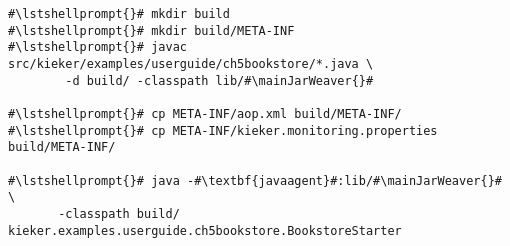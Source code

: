 \begin{lstlisting}[caption=Commands to compile and run the Bookstore under \UnixLikeSystems, label=lst:traceAnalysisCompileRunExample1]
#\lstshellprompt{}# mkdir build
#\lstshellprompt{}# mkdir build/META-INF
#\lstshellprompt{}# javac src/kieker/examples/userguide/ch5bookstore/*.java \
        -d build/ -classpath lib/#\mainJarWeaver{}#

#\lstshellprompt{}# cp META-INF/aop.xml build/META-INF/
#\lstshellprompt{}# cp META-INF/kieker.monitoring.properties build/META-INF/

#\lstshellprompt{}# java -#\textbf{javaagent}#:lib/#\mainJarWeaver{}# \
       -classpath build/ kieker.examples.userguide.ch5bookstore.BookstoreStarter
\end{lstlisting}
